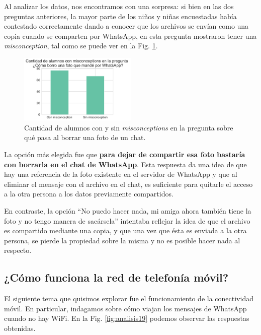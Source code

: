 Al analizar los datos, nos encontramos con una sorpresa: si bien en las dos preguntas anteriores, la mayor parte de los niños y niñas encuestadas había contestado correctamente dando a conocer que los archivos se envían como una copia cuando se comparten por WhatsApp, en esta pregunta mostraron tener una \textit{misconception}, tal como se puede ver en la Fig. \ref{fig:analisis18}.

\begin{figure}[h]
    \centering
    \includegraphics[width=0.5\textwidth]{images_analisis/18.pdf}
    \caption{Cantidad de alumnos con y sin \textit{misconceptions} en la pregunta sobre qué pasa al borrar una foto de un chat.}
    \label{fig:analisis18}
\end{figure}

La opción más elegida fue que \textbf{para dejar de compartir esa foto bastaría con borrarla en el chat de WhatsApp}. Esta respuesta da una idea de que hay una referencia de la foto existente en el servidor de WhatsApp y que al eliminar el mensaje con el archivo en el chat, es suficiente para quitarle el acceso a la otra persona a los datos previamente compartidos.

En contraste, la opción ``No puedo hacer nada, mi amiga ahora también tiene la foto y no tengo manera de sacársela'' intentaba reflejar la idea de que el archivo es compartido mediante una copia, y que una vez que ésta es enviada a la otra persona, se pierde la propiedad sobre la misma y no es posible hacer nada al respecto.
 
\subsection{¿Cómo funciona la red de telefonía móvil?}

El siguiente tema que quisimos explorar fue el funcionamiento de la conectividad móvil. En particular, indagamos sobre cómo viajan los mensajes de WhatsApp cuando no hay WiFi. En la Fig. \ref{fig:analisis19} podemos observar las respuestas obtenidas.

